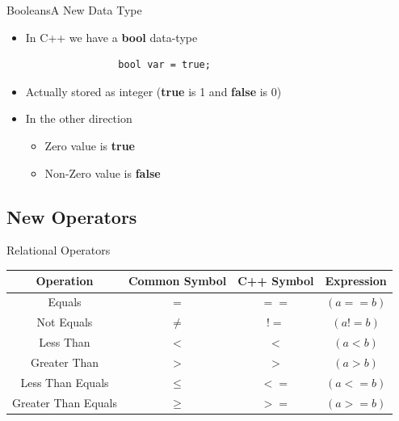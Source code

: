 \begin{frame}[fragile]{Booleans}{A New Data Type}
    \begin{itemize}
        \item In C++ we have a \textbf{bool} data-type
            \begin{verbatim}
                bool var = true;
            \end{verbatim}
        \item Actually stored as integer (\textbf{true} is 1 and \textbf{false} is 0)
        \pause
        \item In the other direction
            \begin{itemize}
                \item Zero value is \textbf{true}
                \item Non-Zero value is \textbf{false}
            \end{itemize}
    \end{itemize}
\end{frame}

\subsection{New Operators}
\begin{frame}[fragile]{Relational Operators}{}
    \begin{table}[]
    \centering
    \begin{tabular}{cccc}
    \hline
    \textbf{Operation}  & \textbf{Common Symbol} & \textbf{C++ Symbol} & \textbf{Expression} \\ \hline
    Equals              & $=$       & $==$  & $(a == b)           $ \\ \hline
    Not Equals          & $\not=$   & $!=$  & $(a \mathrel!= b)           $ \\ \hline
    Less Than           & $<$       & $<$   & $(a < b)    $ \\ \hline
    Greater Than        & $>$       & $>$   & $(a > b) $ \\ \hline
    Less Than Equals    & $\le$     & $<=$  & $(a <= b)   $ \\ \hline
    Greater Than Equals & $\ge$     & $>=$  & $(a >= b)$ \\ \hline
    \end{tabular}
    \end{table}
\end{frame}

